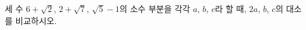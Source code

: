 세 수 $6+\sqrt{2}$, $2+\sqrt{7}$, $\sqrt{5}-1$의 소수 부분을 각각 $a$, $b$, $c$라 할 때, $2a$, $b$, $c$의 대소를 비교하시오.
